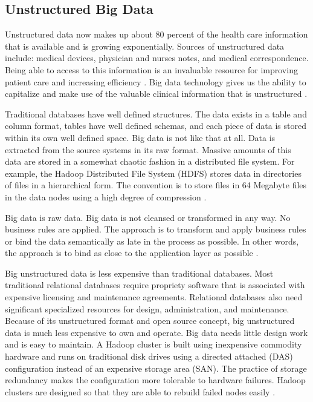 \documentclass[sigconf]{acmart}
\begin{document}
\subsection{Unstructured Big Data}

Unstructured data now makes up about 80 percent of the health care information that is available and is growing exponentially.  Sources of unstructured data include: medical devices, physician and nurses notes, and medical correspondence.  Being able to access to this information is an invaluable resource for improving patient care and increasing efficiency \cite{www-google-McDonald}.  Big data technology gives us the ability to capitalize and make use of the valuable clinical information that is unstructured \cite{www-google-HlthCat}. 

Traditional databases have well defined structures. The data exists in a table and column format, tables have well defined schemas, and each piece of data is stored within its own well defined space.  Big data is not like that at all.  Data is extracted from the source systems in its raw format.  Massive amounts of this data are stored in a somewhat chaotic fashion in a distributed file system.  For example, the Hadoop Distributed File System (HDFS) stores data in directories of files in a hierarchical form. The convention is to store files in 64 Megabyte files in the data nodes using a high degree of compression \cite{www-google-HlthCat}. 

Big data is raw data. Big data is not cleansed or transformed in any way. No business rules are applied. The approach is to transform and apply business rules or bind the data semantically as late in the process as possible.  In other words, the approach is to bind as close to the application layer as possible \cite{www-google-HlthCat}.

Big unstructured data is less expensive than traditional databases. Most traditional relational databases require propriety software that is associated with expensive licensing and maintenance agreements.  Relational databases also need significant specialized resources for design, administration, and maintenance. Because of its unstructured format and open source concept, big unstructured data is much less expensive to own and operate. Big data needs little design work and is easy to maintain. A Hadoop cluster is built using inexpensive commodity hardware and runs on traditional disk drives using a directed attached (DAS) configuration instead of an expensive storage area (SAN).  The practice of storage redundancy makes the configuration more tolerable to hardware failures.  Hadoop clusters are designed so that they are able to rebuild failed nodes easily \cite{www-google-HlthCat}.  
\end{document}
